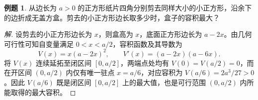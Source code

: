 \documentclass[UTF8,fontset=fandol,a4paper,12pt]{ctexart}
\theoremstyle{definition}
\newtheorem{example}[theorem]{例题}
\begin{document}
\begin{example}
从边长为 $a>0$ 的正方形纸片四角分别剪去同样大小的小正方形，沿余下的边折成无盖方盒。剪去的小正方形边长取多少时，盒子的容积最大？
\end{example}

\begin{proof}[解]
设剪去的小正方形边长为 $x$，则盒高为 $x$，底面正方形边长为 $a-2x$。由几何可行性可知自变量满足 $0<x<a/2$，容积函数及其导数为
\[
 V(x)=x(a-2x)^2,\qquad V'(x)=(a-2x)(a-6x).
\]
将 $V(x)$ 连续延拓至闭区间 $[0,a/2]$，两端点处均有 $V(0)=V(a/2)=0$，而在开区间 $(0,a/2)$ 内仅有唯一驻点 $x=a/6$，对应容积为 $V(a/6)=2a^3/27>0$。因此 $V(a/6)$ 既是闭区间 $[0,a/2]$ 上的最大值，也是可行范围 $(0,a/2)$ 内所能取得的最大容积。
\end{proof}
\end{document}

